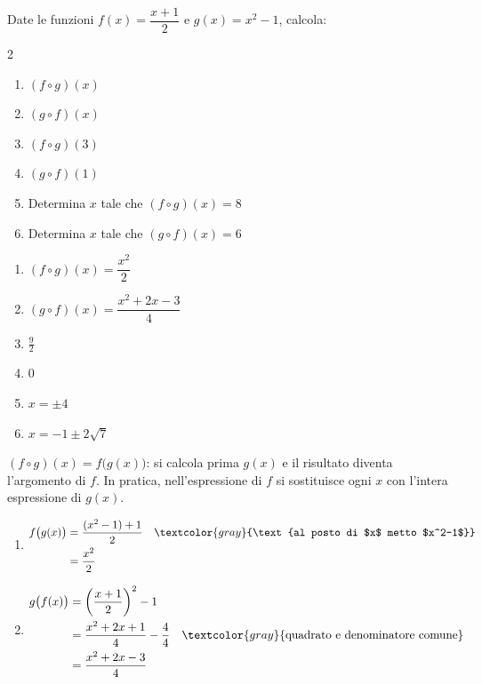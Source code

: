 \begin{question}[ID=1.3, subtitle={Composizione di funzioni con frazioni}, difficulty=media, tags={funzioni, composizione}]
Date le funzioni $f(x)=\dfrac{x+1}{2}$ e $g(x)=x^2-1$, calcola:
\begin{multicols}{2}
\begin{enumerate}[leftmargin=3.2cm]
    \item $(f\circ g)(x)$
    \item $(g\circ f)(x)$
    \item $(f\circ g)(3)$
    \item $(g\circ f)(1)$
    \item Determina $x$ tale che $(f\circ g)(x)=8$
    \item Determina $x$ tale che $(g\circ f)(x)=6$
\end{enumerate}
\end{multicols}
\begin{solution}
\begin{enumerate}
    \item $(f\circ g)(x)=\dfrac{x^2}{2}$
    \item $(g\circ f)(x)=\dfrac{x^2+2x-3}{4}$
    \item $\tfrac92$
    \item $0$
    \item $x=\pm4$
    \item $x=-1\pm2\sqrt7$
\end{enumerate}
\end{solution}
\begin{explanation}
$(f\circ g)(x)=f\big(g(x)\big)$: si calcola prima $g(x)$ e il risultato diventa l'argomento di $f$. In pratica, nell'espressione di $f$ si sostituisce ogni $x$ con l'intera espressione di $g(x)$.
\begin{enumerate}
    \item \[\begin{aligned}
    f\big(g(x)\big) &= \dfrac{(x^2-1)+1}{2} && \textcolor{gray}{\text{al posto di $x$ metto $x^2-1$}}\\
    &= \dfrac{x^2}{2}
    \end{aligned}\]
    \item \[\begin{aligned}
    g\big(f(x)\big) &= \left(\dfrac{x+1}{2}\right)^2-1\\
    &= \dfrac{x^2+2x+1}{4}-\dfrac44 && \textcolor{gray}{\text{quadrato e denominatore comune}}\\
    &= \dfrac{x^2+2x-3}{4}
    \end{aligned}\]

\end{enumerate}
\end{explanation}
\end{question}
